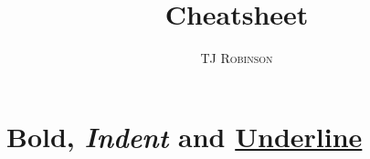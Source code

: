 \documentclass{article}
\begin{document}
\title{Cheatsheet}
\author{\scshape TJ Robinson}
\maketitle

\section{\textbf{Bold}, \normalfont\textsl{Indent} and \underline{Underline}}
\end{document}

